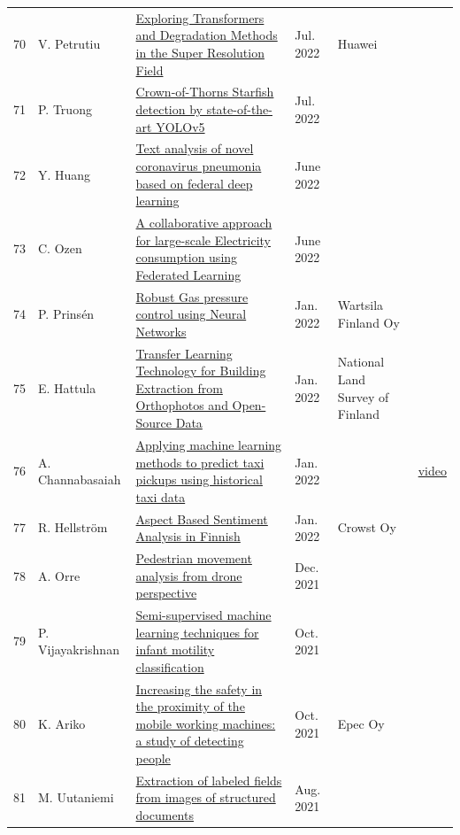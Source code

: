 \documentclass[11pt,a4paper]{article}
\begin{document}
\begin{longtable}{@{}r p{2.8cm} p{6.3cm} p{1.6cm} p{2cm} p{1.8cm}@{}}
70 & V. Petrutiu & \href{https://aaltodoc.aalto.fi/handle/123456789/118298}{Exploring Transformers and Degradation Methods in the Super Resolution Field} & Jul. 2022 & Huawei &  \\
71 & P. Truong & \href{https://aaltodoc.aalto.fi/handle/123456789/116281}{Crown-of-Thorns Starfish detection by state-of-the-art YOLOv5} & Jul. 2022 &  &  \\
72 & Y. Huang & \href{https://aaltodoc.aalto.fi/handle/123456789/115546}{Text analysis of novel coronavirus pneumonia based on federal deep learning} & June 2022 &  &  \\
73 & C. Ozen & \href{https://aaltodoc.aalto.fi/handle/123456789/115282}{A collaborative approach for large-scale Electricity consumption using Federated Learning} & June 2022 &  &  \\
74 & P. Prinsén & \href{https://aaltodoc.aalto.fi/handle/123456789/112627}{Robust Gas pressure control using Neural Networks} & Jan. 2022 & Wartsila Finland Oy &  \\
75 & E. Hattula & \href{https://aaltodoc.aalto.fi/handle/123456789/112450}{Transfer Learning Technology for Building Extraction from Orthophotos and Open-Source Data} & Jan. 2022 & National Land Survey of Finland &  \\
76 & A. Channabasaiah & \href{https://aaltodoc.aalto.fi/handle/123456789/112871}{Applying machine learning methods to predict taxi pickups using historical taxi data} & Jan. 2022 &  & \href{https://youtu.be/rCsalSR1u1Y}{video} \\
77 & R. Hellström & \href{https://aaltodoc.aalto.fi/handle/123456789/112857}{Aspect Based Sentiment Analysis in Finnish} & Jan. 2022 & Crowst Oy &  \\
78 & A. Orre & \href{https://aaltodoc.aalto.fi/handle/123456789/111730}{Pedestrian movement analysis from drone perspective} & Dec. 2021 &  &  \\
79 & P. Vijayakrishnan & \href{https://aaltodoc.aalto.fi/handle/123456789/110565}{Semi-supervised machine learning techniques for infant motility classification} & Oct. 2021 &  &  \\
80 & K. Ariko & \href{https://aaltodoc.aalto.fi/handle/123456789/110498}{Increasing the safety in the proximity of the mobile working machines: a study of detecting people} & Oct. 2021 & Epec Oy &  \\
81 & M. Uutaniemi & \href{https://aaltodoc.aalto.fi/handle/123456789/109305}{Extraction of labeled fields from images of structured documents} & Aug. 2021 &  &  \\

\end{longtable}
\end{document}
